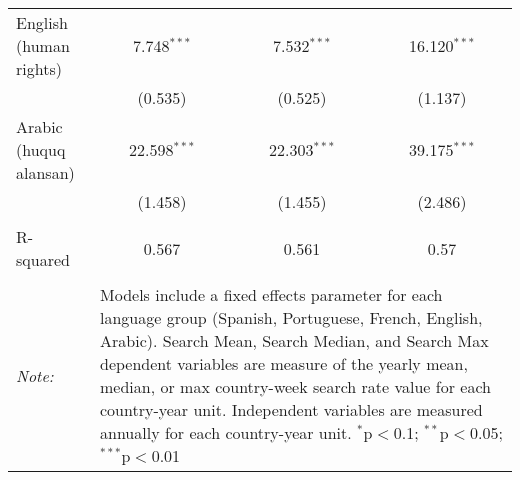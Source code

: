 \begin{table}[!htbp]
\begin{tabular}{@{\extracolsep{5pt}}lccc}
  English (human rights) & 7.748$^{***}$ & 7.532$^{***}$ & 16.120$^{***}$ \\ 
  & (0.535) & (0.525) & (1.137) \\ 
  Arabic (huquq alansan) & 22.598$^{***}$ & 22.303$^{***}$ & 39.175$^{***}$ \\ 
  & (1.458) & (1.455) & (2.486) \\ 
 \hline \\[-1.8ex] 
R-squared  & 0.567 & 0.561 & 0.57 \\ 
\hline 
\hline \\[-1.8ex] 
\textit{Note:}  & \multicolumn{3}{l}{\parbox[t]{8cm}{Models include a fixed effects parameter for each language group (Spanish, Portuguese, French, English, Arabic). Search Mean, Search Median, and Search Max dependent variables are measure of the yearly mean, median, or max country-week search rate value for each country-year unit. Independent variables are measured annually for each country-year unit. $^{*}$p$<$0.1; $^{**}$p$<$0.05; $^{***}$p$<$0.01}} \\ 
\end{tabular} 
\end{table} 
